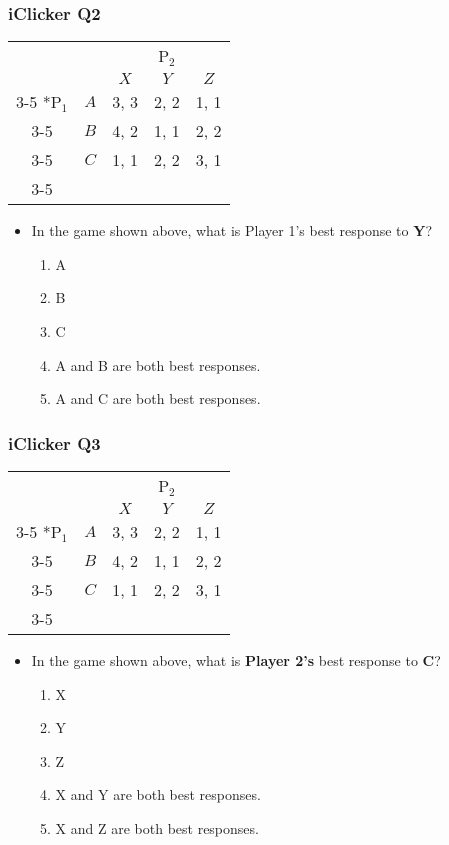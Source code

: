 \begin{frame}
\frametitle{iClicker Q2}
\begin{table}[h]
\centering
\begin{tabular}{cc|c|c|c|}
	& \multicolumn{1}{c}{} & \multicolumn{3}{c}{P$_2$}\\
	& \multicolumn{1}{c}{} & \multicolumn{1}{c}{$X$} & \multicolumn{1}{c}{$Y$} & \multicolumn{1}{c}{$Z$} \\\cline{3-5}
	\multirow{3}*{P$_1$}  & $A$ & 3, 3 & 2, 2 & 1, 1 \\\cline{3-5}
	& $B$ & 4, 2 & 1, 1 & 2, 2 \\\cline{3-5}
	& $C$ & 1, 1 & 2, 2 & 3, 1  \\\cline{3-5}
\end{tabular}
\end{table}
\begin{itemize}
\item In the game shown above, what is Player 1's best response to \textbf{Y}?
\begin{enumerate}
	\item A
	\item B
	\item C
	\item A and B are both best responses.
	\item A and C are both best responses.
\end{enumerate}
\end{itemize}
\end{frame}

\begin{frame}
\frametitle{iClicker Q3}
\begin{table}[h]
\centering
\begin{tabular}{cc|c|c|c|}
	& \multicolumn{1}{c}{} & \multicolumn{3}{c}{P$_2$}\\
	& \multicolumn{1}{c}{} & \multicolumn{1}{c}{$X$} & \multicolumn{1}{c}{$Y$} & \multicolumn{1}{c}{$Z$} \\\cline{3-5}
	\multirow{3}*{P$_1$}  & $A$ & 3, 3 & 2, 2 & 1, 1 \\\cline{3-5}
	& $B$ & 4, 2 & 1, 1 & 2, 2 \\\cline{3-5}
	& $C$ & 1, 1 & 2, 2 & 3, 1  \\\cline{3-5}
\end{tabular}
\end{table}
\begin{itemize}
\item In the game shown above, what is \textbf{Player 2's} best response to \textbf{C}?
\begin{enumerate}
	\item X
	\item Y
	\item Z
	\item X and Y are both best responses.
	\item X and Z are both best responses.
\end{enumerate}
\end{itemize}
\end{frame}

